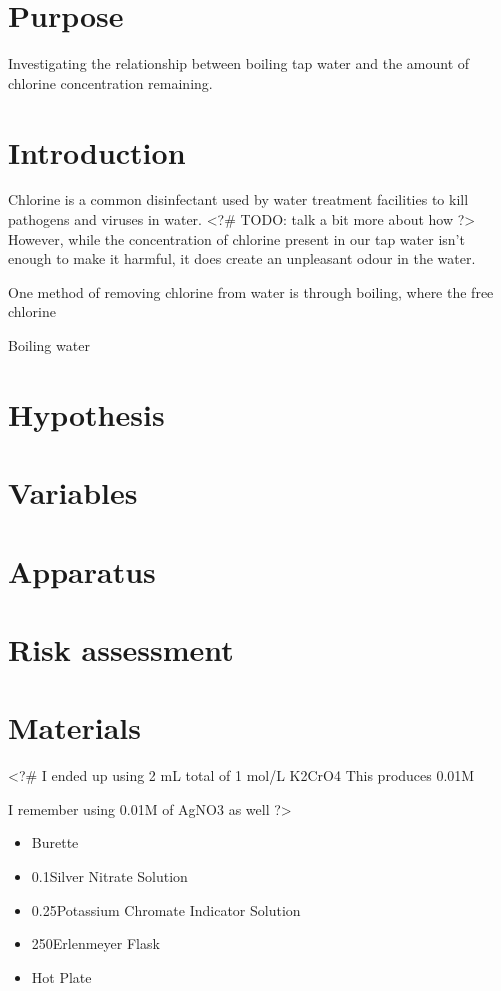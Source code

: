 \documentclass[12pt, demo]{article}
\begin{document}
\section*{Purpose}
Investigating the relationship between boiling tap water and the amount of chlorine concentration remaining.

\section*{Introduction}
Chlorine is a common disinfectant used by water treatment facilities to kill pathogens and viruses in water. <?# TODO: talk a bit more about how ?> However, while the concentration of chlorine present in our tap water isn't enough to make it harmful, it does create an unpleasant odour in the water.

One method of removing chlorine from water is through boiling, where the free chlorine

Boiling water


\section*{Hypothesis}

\section*{Variables}

\section*{Apparatus}

\section*{Risk assessment}


\section*{Materials}

<?#
I ended up using 2 mL total of 1 mol/L K2CrO4
This produces 0.01M

I remember using 0.01M of AgNO3 as well
?>

\begin{itemize}
	\item Burette
	\item 0.1\mpl Silver Nitrate Solution
	\item 0.25\mpl Potassium Chromate Indicator Solution
	\item 250\ml Erlenmeyer Flask
	\item Hot Plate
\end{itemize}
\end{document}
